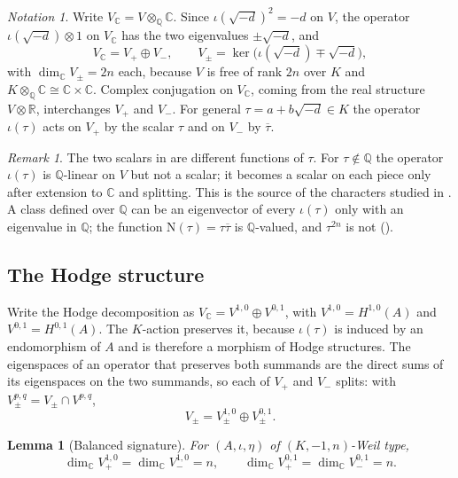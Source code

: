 \documentclass[11pt,reqno]{amsart}
\theoremstyle{plain}
\newtheorem{lemma}[theorem]{Lemma}
\theoremstyle{definition}
\theoremstyle{remark}
\newtheorem{remark}[theorem]{Remark}
\newtheorem{notation}[theorem]{Notation}
\newcommand{\QQ}{\mathbb{Q}}
\newcommand{\RR}{\mathbb{R}}
\newcommand{\CC}{\mathbb{C}}
\newcommand{\Nm}{\mathrm{N}}             %
\newcommand{\bbar}[1]{\overline{#1}}
\begin{document}
\begin{notation}\label{not:eigen}
Write $V_{\CC}=V\otimes_{\QQ}\CC$. Since $\iota(\sqrt{-d})^{2}=-d$ on $V$,
the operator $\iota(\sqrt{-d})\otimes1$ on $V_{\CC}$ has the two
eigenvalues $\pm\sqrt{-d}$, and
\begin{equation}\label{eq:Vsplit}
  V_{\CC}=V_{+}\oplus V_{-},
  \qquad
  V_{\pm}=\ker\bigl(\iota(\sqrt{-d})\mp\sqrt{-d}\bigr),
\end{equation}
with $\dim_{\CC}V_{\pm}=2n$ each, because $V$ is free of rank $2n$ over $K$ and
$K\otimes_{\QQ}\CC\cong\CC\times\CC$. Complex conjugation on $V_{\CC}$, coming
from the real structure $V\otimes\RR$, interchanges $V_{+}$ and $V_{-}$. For
general $\tau=a+b\sqrt{-d}\in K$ the operator $\iota(\tau)$ acts on $V_{+}$ by
the scalar $\tau$ and on $V_{-}$ by $\bbar{\tau}$.
\end{notation}

\begin{remark}\label{rem:tautbar}
The two scalars in  are different functions of $\tau$. For
$\tau\notin\QQ$ the operator $\iota(\tau)$ is $\QQ$-linear on $V$ but not a
scalar; it becomes a scalar on each piece only after extension to $\CC$ and
splitting. This is the source of the characters studied in
. A class defined over $\QQ$ can be an eigenvector of
every $\iota(\tau)$ only with an eigenvalue in $\QQ$; the function
$\Nm(\tau)=\tau\bbar{\tau}$ is $\QQ$-valued, and $\tau^{2n}$ is not
().
\end{remark}

\subsection{The Hodge structure}

Write the Hodge decomposition as $V_{\CC}=V^{1,0}\oplus V^{0,1}$, with
$V^{1,0}=H^{1,0}(A)$ and $V^{0,1}=H^{0,1}(A)$. The $K$-action preserves it,
because $\iota(\tau)$ is induced by an endomorphism of $A$ and is therefore a
morphism of Hodge structures. The eigenspaces of an operator that preserves
both summands are the direct sums of its eigenspaces on the two summands, so
each of $V_{+}$ and $V_{-}$ splits: with $V^{p,q}_{\pm}=V_{\pm}\cap V^{p,q}$,
\begin{equation}\label{eq:bisplit}
  V_{\pm}=V_{\pm}^{1,0}\oplus V_{\pm}^{0,1}.
\end{equation}

\begin{lemma}[Balanced signature]\label{lem:balanced}
For $(A,\iota,\eta)$ of $(K,-1,n)$-Weil type,
\[
  \dim_{\CC}V_{+}^{1,0}=\dim_{\CC}V_{-}^{1,0}=n,
  \qquad
  \dim_{\CC}V_{+}^{0,1}=\dim_{\CC}V_{-}^{0,1}=n .
\]
\end{lemma}
\end{document}
